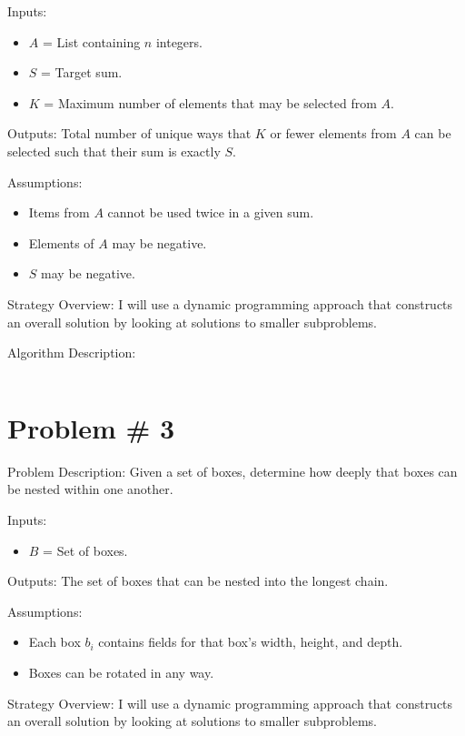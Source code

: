 \documentclass{article}
\begin{document}
Inputs:
\begin{itemize}
    \item $A$ = List containing $n$ integers.
    \item $S$ = Target sum.
    \item $K$ = Maximum number of elements that may be selected from $A$. 
\end{itemize}

Outputs: Total number of unique ways that $K$ or fewer elements from $A$ can be selected such that their sum is exactly $S$. 

Assumptions:
\begin{itemize}
    \item Items from $A$ cannot be used twice in a given sum.
    \item Elements of $A$ may be negative.
    \item $S$ may be negative.
\end{itemize}

Strategy Overview:
I will use a dynamic programming approach that constructs an overall solution by looking at solutions to smaller subproblems.

Algorithm Description:
\begin{lstlisting}
\end{lstlisting}

\section*{Problem \# 3}
Problem Description: Given a set of boxes, determine how deeply that boxes can be nested within one another.

Inputs:
\begin{itemize}
    \item $B$ = Set of boxes.
\end{itemize}

Outputs: The set of boxes that can be nested into the longest chain.

Assumptions:
\begin{itemize}
    \item Each box $b_i$ contains fields for that box's width, height, and depth.
    \item Boxes can be rotated in any way.
\end{itemize}

Strategy Overview:
I will use a dynamic programming approach that constructs an overall solution by looking at solutions to smaller subproblems.
\end{document}
